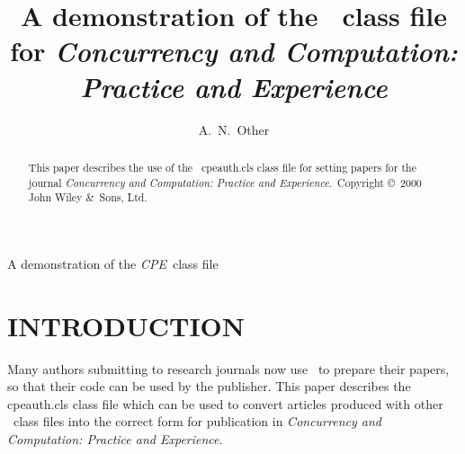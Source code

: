 \documentclass{cpeauth}
\begin{document}
\def\cop{Copyright \copyright\ 2000 John Wiley \&\ Sons, Ltd.}


 {A demonstration of the
\emph{CPE}\ class file}

\title{A demonstration of the \LaTeXe\ class file for
\itshape{Concurrency and Computation: Practice and Experience}\footnotemark[3]}

\author{A.~N.~Other\corrauth\comma\footnotemark[2]}







\noaccepted{}

\begin{abstract}
This paper describes the use of the \LaTeXe\ \textsf{cpeauth.cls} class file
for setting papers for the journal \emph{Concurrency and Computation: Practice and Experience}.~\cop
\end{abstract}


\section{INTRODUCTION}
Many authors submitting to research journals now use \LaTeXe\ to prepare
their papers, so that their code can be used by the publisher.
This paper describes the \textsf{cpeauth.cls} class file
which can be used to convert articles produced with other \LaTeXe\ class files
into the correct form for publication
in \emph{Concurrency and Computation: Practice and Experience}.
\end{document}
